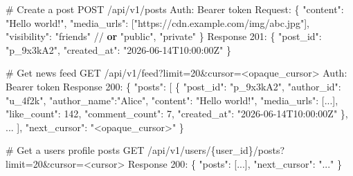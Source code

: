 \documentclass[11pt]{article}
\newenvironment{Shaded}{\begin{snugshade}}{\end{snugshade}}
\newcommand{\CommentTok}[1]{\textcolor[rgb]{0.48,0.49,0.49}{#1}}
\newcommand{\DecValTok}[1]{\textcolor[rgb]{0.96,0.45,0.00}{#1}}
\newcommand{\KeywordTok}[1]{\textcolor[rgb]{0.81,0.81,0.76}{\textbf{#1}}}
\newcommand{\NormalTok}[1]{\textcolor[rgb]{0.81,0.81,0.76}{#1}}
\newcommand{\OperatorTok}[1]{\textcolor[rgb]{0.81,0.81,0.76}{#1}}
\newcommand{\StringTok}[1]{\textcolor[rgb]{0.96,0.31,0.31}{#1}}
\begin{document}

\begin{Shaded}
\begin{Highlighting}[]
\CommentTok{\# Create a post}
\NormalTok{POST }\OperatorTok{/}\NormalTok{api}\OperatorTok{/}\NormalTok{v1}\OperatorTok{/}\NormalTok{posts}
\NormalTok{Auth: Bearer token}
\NormalTok{Request:}
\NormalTok{  \{}
    \StringTok{"content"}\NormalTok{:    }\StringTok{"Hello world!"}\NormalTok{,}
    \StringTok{"media\_urls"}\NormalTok{: [}\StringTok{"https://cdn.example.com/img/abc.jpg"}\NormalTok{],}
    \StringTok{"visibility"}\NormalTok{: }\StringTok{"friends"}   \OperatorTok{//} \KeywordTok{or} \StringTok{"public"}\NormalTok{, }\StringTok{"private"}
\NormalTok{  \}}
\NormalTok{Response }\DecValTok{201}\NormalTok{:}
\NormalTok{  \{}
    \StringTok{"post\_id"}\NormalTok{:    }\StringTok{"p\_9x3kA2"}\NormalTok{,}
    \StringTok{"created\_at"}\NormalTok{: }\StringTok{"2026{-}06{-}14T10:00:00Z"}
\NormalTok{  \}}

\CommentTok{\# Get news feed}
\NormalTok{GET }\OperatorTok{/}\NormalTok{api}\OperatorTok{/}\NormalTok{v1}\OperatorTok{/}\NormalTok{feed?limit}\OperatorTok{=}\DecValTok{20}\OperatorTok{\&}\NormalTok{cursor}\OperatorTok{=\textless{}}\NormalTok{opaque\_cursor}\OperatorTok{\textgreater{}}
\NormalTok{Auth: Bearer token}
\NormalTok{Response }\DecValTok{200}\NormalTok{:}
\NormalTok{  \{}
    \StringTok{"posts"}\NormalTok{: [}
\NormalTok{      \{}
        \StringTok{"post\_id"}\NormalTok{:    }\StringTok{"p\_9x3kA2"}\NormalTok{,}
        \StringTok{"author\_id"}\NormalTok{:  }\StringTok{"u\_4f2k"}\NormalTok{,}
        \StringTok{"author\_name"}\NormalTok{:}\StringTok{"Alice"}\NormalTok{,}
        \StringTok{"content"}\NormalTok{:    }\StringTok{"Hello world!"}\NormalTok{,}
        \StringTok{"media\_urls"}\NormalTok{: [...],}
        \StringTok{"like\_count"}\NormalTok{: }\DecValTok{142}\NormalTok{,}
        \StringTok{"comment\_count"}\NormalTok{: }\DecValTok{7}\NormalTok{,}
        \StringTok{"created\_at"}\NormalTok{: }\StringTok{"2026{-}06{-}14T10:00:00Z"}
\NormalTok{      \},}
\NormalTok{      ...}
\NormalTok{    ],}
    \StringTok{"next\_cursor"}\NormalTok{: }\StringTok{"\textless{}opaque\_cursor\textgreater{}"}
\NormalTok{  \}}

\CommentTok{\# Get a user\textquotesingle{}s profile posts}
\NormalTok{GET }\OperatorTok{/}\NormalTok{api}\OperatorTok{/}\NormalTok{v1}\OperatorTok{/}\NormalTok{users}\OperatorTok{/}\NormalTok{\{user\_id\}}\OperatorTok{/}\NormalTok{posts?limit}\OperatorTok{=}\DecValTok{20}\OperatorTok{\&}\NormalTok{cursor}\OperatorTok{=\textless{}}\NormalTok{cursor}\OperatorTok{\textgreater{}}
\NormalTok{Response }\DecValTok{200}\NormalTok{: \{ }\StringTok{"posts"}\NormalTok{: [...], }\StringTok{"next\_cursor"}\NormalTok{: }\StringTok{"..."}\NormalTok{ \}}
\end{Highlighting}
\end{Shaded}
\end{document}
